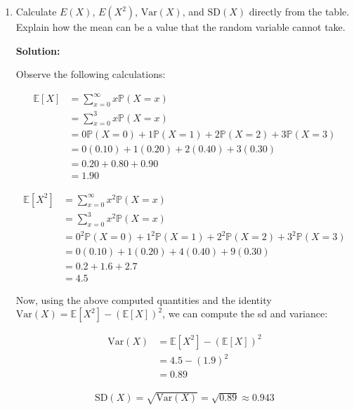 \documentclass[11pt]{article}
\newcommand{\solution}{\par\medskip\noindent\textbf{Solution:}\par\vspace{0cm}}
\begin{document}
\begin{enumerate}[label=\textbf{(\alph*)}]
  The last two probabilities differ because we are operating in a discrete probability space and $\mathbb{P}(X > 2)$ does not include the event that $X = 2$, while $\mathbb{P}(X \geq 2)$ does. Hence, because $\mathbb{P}(X = 2) = 0.4 > 0$, our probabilities cannot be equivalent.

  \item Calculate $E(X)$, $E(X^2)$, $\text{Var}(X)$, and $\text{SD}(X)$ directly from the table. Explain how the mean can be a value that the random variable cannot take.
  \solution

  Observe the following calculations:

  \begin{align*}
  \mathbb{E}[X] &= \sum_{x = 0}^{\infty} x \mathbb{P}(X = x) \\
  &= \sum_{x = 0}^{3} x \mathbb{P}(X = x) \\
  &= 0\mathbb{P}(X = 0) + 1\mathbb{P}(X = 1) + 2\mathbb{P}(X = 2) + 3\mathbb{P}(X = 3) \\
  &= 0(0.10) + 1(0.20) + 2(0.40) + 3(0.30) \\
  &= 0.20 + 0.80 + 0.90 \\
  &= 1.90
  \end{align*}

  \begin{align*}
  \mathbb{E}[X^2] &= \sum_{x = 0}^{\infty} x^2 \mathbb{P}(X = x) \\
  &= \sum_{x = 0}^{3} x^2 \mathbb{P}(X = x) \\
  &= 0^2\mathbb{P}(X = 0) + 1^2\mathbb{P}(X = 1) + 2^2\mathbb{P}(X = 2) + 3^2\mathbb{P}(X = 3) \\
  &= 0(0.10) + 1(0.20) + 4(0.40) + 9(0.30) \\
  &= 0.2 + 1.6 + 2.7 \\
  &= 4.5
  \end{align*}

  Now, using the above computed quantities and the identity $\text{Var}(X) = \mathbb{E}[X^2] - (\mathbb{E}[X])^2$, we can compute the sd and variance:
  
  \begin{align*}
  \text{Var}(X) &= \mathbb{E}[X^2] - (\mathbb{E}[X])^2 \\
  &= 4.5 - (1.9)^2 \\
  &= 0.89
  \end{align*}

  \begin{align*}
    \text{SD}(X) = \sqrt{\text{Var}(X)} = \sqrt{0.89} \approx 0.943
  \end{align*}


\end{enumerate}
\end{document}
